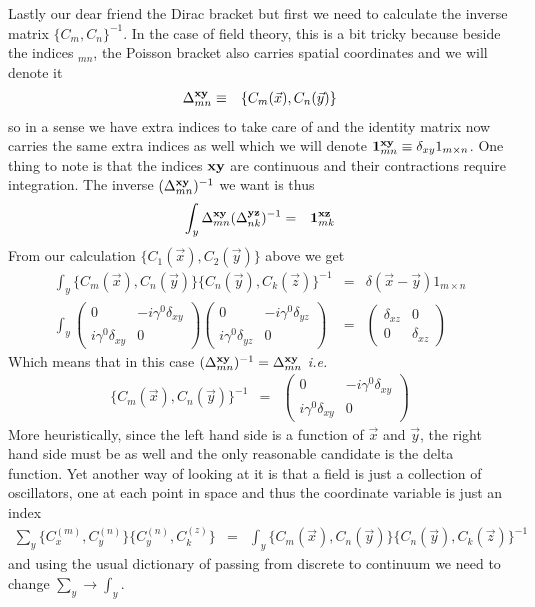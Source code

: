 \documentclass[aps,preprint,preprintnumbers,nofootinbib,showpacs,prd]{revtex4-1}
\newcommand{\ie}{{\it i.e.} }
\newcommand{\nbea}{\begin{eqnarray*}}
\newcommand{\neea}{\end{eqnarray*}}
\begin{document}
Lastly our dear friend the Dirac bracket but first we need to calculate the inverse matrix $\{C_m, C_n\}^{-1}$. In the case of field theory, this is a bit tricky because beside the indices $_{mn}$, the Poisson bracket also carries spatial coordinates and we will denote it
%
\nbea
\Delta_{mn}^{\bf xy} & \equiv & \{C_m(\vec x), C_n(\vec y)\}
\neea
%
so in a sense we have extra indices to take care of and the identity matrix now carries the same extra indices as well which we will denote ${\bf 1}_{mn}^{\bf xy} \equiv \delta_{xy} 1_{m\times n}$. One thing to note is that the indices ${\bf xy}$ are continuous and their contractions require integration. The inverse $(\Delta_{mn}^{\bf xy})^{-1}$ we want is thus
%
\nbea
\int _y \Delta_{mn}^{\bf xy} (\Delta_{nk}^{\bf yz})^{-1} & = & {\bf 1}_{mk}^{\bf xz}
\neea
%
From our calculation $\{C_1(\vec x), C_2(\vec y)\}$ above we get
%
\nbea
\int_y \{C_m(\vec x), C_n(\vec y)\} \{C_n(\vec y), C_k(\vec z)\}^{-1} & = & \delta(\vec x-  \vec y) 1_{m\times n} \\
\int_y \left ( \begin{array}{cc}
0 & -i \gamma^0 \delta_{xy} \\
i \gamma^0\delta_{xy} & 0
\end{array} \right )
\left ( \begin{array}{cc}
0 & -i \gamma^0 \delta_{yz} \\
i \gamma^0\delta_{yz} & 0
\end{array} \right ) & = & \left ( \begin{array}{cc}
\delta_{xz} & 0 \\
0 & \delta_{xz}
\end{array} \right )
\neea
%
Which means that in this case $(\Delta_{mn}^{\bf xy})^{-1} = \Delta_{mn}^{\bf xy}$ \ie
%
\nbea
\{C_m(\vec x), C_n(\vec y)\}^{-1} & = & \left ( \begin{array}{cc}
0 & -i \gamma^0 \delta_{xy} \\
i \gamma^0\delta_{xy} & 0
\end{array} \right )
\neea
%
More heuristically, since the left hand side is a function of $\vec x$ and $\vec y$, the right hand side must be as well and the only reasonable candidate is the delta function. Yet another way of looking at it is that a field is just a collection of oscillators, one at each point in space and thus the coordinate variable is just an index
%
\nbea
\sum_{y}\{C^{(m)}_x, C^{(n)}_y\}\{C^{(n)}_y, C^{(z)}_k\} & = & \int_y \{C_m(\vec x), C_n(\vec y)\} \{C_n(\vec y), C_k(\vec z)\}^{-1}
\neea
%
and using the usual dictionary of passing from discrete to continuum we need to change $\sum_y \to \int_y$.
\end{document}
